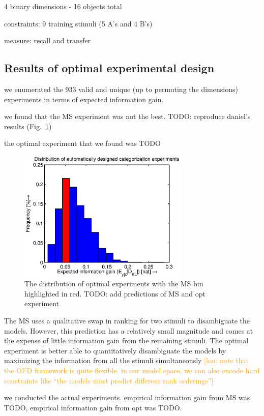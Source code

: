 \documentclass{article}
\newcommand{\lou}[1]{\textcolor{orange}{[lou: #1]}}
\newcommand{\cas}[1]{ \textsf{\color{darkgray} \scriptsize #1} }
\begin{document}
\cas{4 binary dimensions - 16 objects total}

\cas{constraints: 9 training stimuli (5 A's and 4 B's)}

\cas{measure: recall and transfer}

\subsection{Results of optimal experimental design}

\cas{we enumerated the 933 valid and unique (up to permuting the dimensions) experiments in terms of expected information gain.}

\cas{we found that the MS experiment was not the best. TODO: reproduce daniel's results (Fig.~\ref{fig:dist})}

\cas{the optimal experiment that we found was TODO}

\begin{figure}[h!]
\centering
\includegraphics[width=3.2in]{img/dist.eps}
\caption{The distribution of optimal experiments with the MS bin highlighted in red. TODO: add predictions of MS and opt experiment}
\label{fig:dist}
\end{figure}

The MS uses a qualitative swap in ranking for two stimuli to disambiguate the models.
However, this prediction has a relatively small magnitude and comes at the expense of little information gain from the remaining stimuli.
The optimal experiment is better able to quantitatively disambiguate the models by maximizing the information from all the stimuli simultaneously
\lou{note that the OED framework is quite flexible. in our model space, we can also encode hard constraints like ``the models must predict different rank orderings''}

\cas{we conducted the actual experiments. empirical information gain from MS was TODO, empirical information gain from opt was TODO.}
\end{document}
